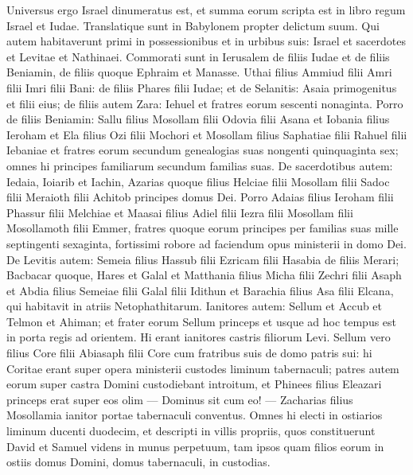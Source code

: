 \begin{biblechapter}
\begin{biblechapter}
\begin{biblechapter}
\begin{biblechapter}
\begin{biblechapter}
\begin{biblechapter}
\begin{biblechapter}
\begin{biblechapter}
\begin{biblechapter}
\verse Universus ergo Israel dinumeratus est, et summa eorum scripta est in libro regum Israel et Iudae. Translatique sunt in Babylonem propter delictum suum. 
\verse Qui autem habitaverunt primi in possessionibus et in urbibus suis: Israel et sacerdotes et Levitae et Nathinaei.
 \verse Commorati sunt in Ierusalem de filiis Iudae et de filiis Beniamin, de filiis quoque Ephraim et Manasse. 
\verse Uthai filius Ammiud filii Amri filii Imri filii Bani: de filiis Phares filii Iudae; 
\verse et de Selanitis: Asaia primogenitus et filii eius; 
\verse de filiis autem Zara: Iehuel et fratres eorum sescenti nonaginta. 
\verse Porro de filiis Beniamin: Sallu filius Mosollam filii Odovia filii Asana 
 \verse et Iobania filius Ieroham et Ela filius Ozi filii Mochori et Mosollam filius Saphatiae filii Rahuel filii Iebaniae 
\verse et fratres eorum secundum genealogias suas nongenti quinquaginta sex; omnes hi principes familiarum secundum familias suas.
 \verse De sacerdotibus autem: Iedaia, Ioiarib et Iachin, 
\verse Azarias quoque filius Helciae filii Mosollam filii Sadoc filii Meraioth filii Achitob principes domus Dei. 
\verse Porro Adaias filius Ieroham filii Phassur filii Melchiae et Maasai filius Adiel filii Iezra filii Mosollam filii Mosollamoth filii Emmer, 
 \verse fratres quoque eorum principes per familias suas mille septingenti sexaginta, fortissimi robore ad faciendum opus ministerii in domo Dei.
 \verse De Levitis autem: Semeia filius Hassub filii Ezricam filii Hasabia de filiis Merari; 
\verse Bacbacar quoque, Hares et Galal et Matthania filius Micha filii Zechri filii Asaph 
\verse et Abdia filius Semeiae filii Galal filii Idithun et Barachia filius Asa filii Elcana, qui habitavit in atriis Netophathitarum. 
 \verse Ianitores autem: Sellum et Accub et Telmon et Ahiman; et frater eorum Sellum princeps 
\verse et usque ad hoc tempus est in porta regis ad orientem. Hi erant ianitores castris filiorum Levi. 
\verse Sellum vero filius Core filii Abiasaph filii Core cum fratribus suis de domo patris sui: hi Coritae erant super opera ministerii custodes liminum tabernaculi; patres autem eorum super castra Domini custodiebant introitum, 
\verse et Phinees filius Eleazari princeps erat super eos olim — Dominus sit cum eo! — 
\verse Zacharias filius Mosollamia ianitor portae tabernaculi conventus. 
\verse Omnes hi electi in ostiarios liminum ducenti duodecim, et descripti in villis propriis, quos constituerunt David et Samuel videns in munus perpetuum, 
\verse tam ipsos quam filios eorum in ostiis domus Domini, domus tabernaculi, in custodias. 

\end{biblechapter}
\end{biblechapter}
\end{biblechapter}
\end{biblechapter}
\end{biblechapter}
\end{biblechapter}
\end{biblechapter}
\end{biblechapter}
\end{biblechapter}
